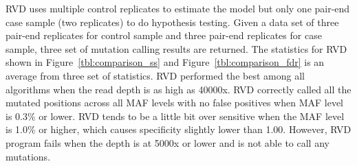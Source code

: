 \documentclass{bioinfo}
\begin{document}
RVD uses multiple control replicates to estimate the model but only one pair-end case sample (two replicates) to do hypothesis testing. Given a data set of three pair-end replicates for control sample and three pair-end replicates for case sample, three set of mutation calling results are returned. The statistics for RVD shown in Figure~\ref{tbl:comparison_ss} and Figure~\ref{tbl:comparison_fdr} is an average from three set of statistics. RVD performed the best among all algorithms when the read depth is as high as 40000x. RVD correctly called all the mutated positions across all MAF levels with no false positives when MAF level is 0.3\% or lower. RVD tends to be a little bit over sensitive when the MAF level is 1.0\% or higher, which causes specificity slightly lower than 1.00. However, RVD program fails when the depth is at 5000x or lower and is not able to call any mutations.
\end{document}
